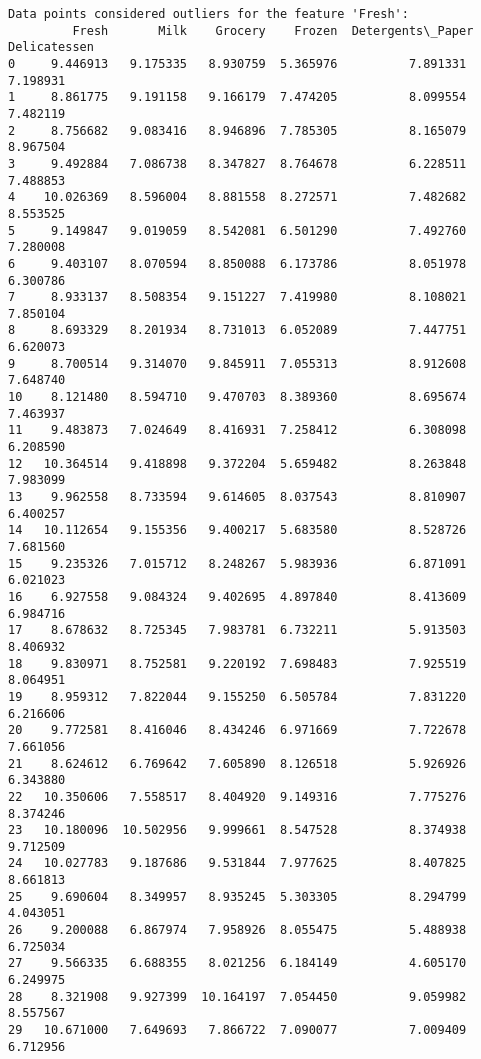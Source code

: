 \documentclass[11pt]{article}
\begin{document}
    \begin{Verbatim}[commandchars=\\\{\}]
Data points considered outliers for the feature 'Fresh':
         Fresh       Milk    Grocery    Frozen  Detergents\_Paper  Delicatessen
0     9.446913   9.175335   8.930759  5.365976          7.891331      7.198931
1     8.861775   9.191158   9.166179  7.474205          8.099554      7.482119
2     8.756682   9.083416   8.946896  7.785305          8.165079      8.967504
3     9.492884   7.086738   8.347827  8.764678          6.228511      7.488853
4    10.026369   8.596004   8.881558  8.272571          7.482682      8.553525
5     9.149847   9.019059   8.542081  6.501290          7.492760      7.280008
6     9.403107   8.070594   8.850088  6.173786          8.051978      6.300786
7     8.933137   8.508354   9.151227  7.419980          8.108021      7.850104
8     8.693329   8.201934   8.731013  6.052089          7.447751      6.620073
9     8.700514   9.314070   9.845911  7.055313          8.912608      7.648740
10    8.121480   8.594710   9.470703  8.389360          8.695674      7.463937
11    9.483873   7.024649   8.416931  7.258412          6.308098      6.208590
12   10.364514   9.418898   9.372204  5.659482          8.263848      7.983099
13    9.962558   8.733594   9.614605  8.037543          8.810907      6.400257
14   10.112654   9.155356   9.400217  5.683580          8.528726      7.681560
15    9.235326   7.015712   8.248267  5.983936          6.871091      6.021023
16    6.927558   9.084324   9.402695  4.897840          8.413609      6.984716
17    8.678632   8.725345   7.983781  6.732211          5.913503      8.406932
18    9.830971   8.752581   9.220192  7.698483          7.925519      8.064951
19    8.959312   7.822044   9.155250  6.505784          7.831220      6.216606
20    9.772581   8.416046   8.434246  6.971669          7.722678      7.661056
21    8.624612   6.769642   7.605890  8.126518          5.926926      6.343880
22   10.350606   7.558517   8.404920  9.149316          7.775276      8.374246
23   10.180096  10.502956   9.999661  8.547528          8.374938      9.712509
24   10.027783   9.187686   9.531844  7.977625          8.407825      8.661813
25    9.690604   8.349957   8.935245  5.303305          8.294799      4.043051
26    9.200088   6.867974   7.958926  8.055475          5.488938      6.725034
27    9.566335   6.688355   8.021256  6.184149          4.605170      6.249975
28    8.321908   9.927399  10.164197  7.054450          9.059982      8.557567
29   10.671000   7.649693   7.866722  7.090077          7.009409      6.712956

\end{Verbatim}
\end{document}
